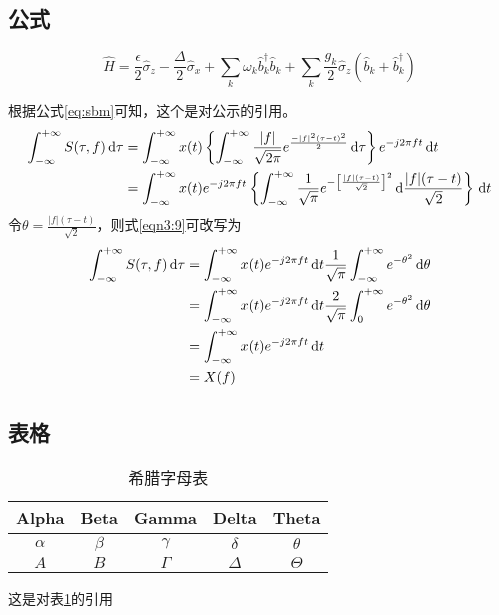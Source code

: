 \subsection{公式}
\begin{equation}
    \hat{H}=\frac{\epsilon}{2}\hat{\sigma}_{z}-\frac{\Delta}{2}\hat{\sigma}_{x}+\sum_{k}\omega_{k}\hat{b}_{k}^{\dagger}\hat{b}_{k}+\sum_{k}\frac{g_{k}}{2}\hat{\sigma}_{z}(\hat{b}_{k}+\hat{b}_{k}^{\dagger})\label{eq:sbm}
\end{equation}

根据公式\ref{eq:sbm}可知，这个是对公示的引用。
\begin{align}\label{eqn3:9}
    \int_{-\infty}^{+\infty}S(\tau,f)\,\mathrm{d}\tau & =\int_{-\infty}^{+\infty}x(t)\left\{\int_{-\infty}^{+\infty}\frac{|f|}{\sqrt{2\pi}}e^{\frac{-|f|^2(\tau-t)^2}{2}}\,\mathrm{d}\tau\right\}e^{-j2\pi ft}\,\mathrm{d}t\notag                                  \\
                                                      & =\int_{-\infty}^{+\infty}x(t)e^{-j2\pi ft}\left\{\int_{-\infty}^{+\infty}\frac{1}{\sqrt{\pi}}e^{-\left[\frac{|f|(\tau-t)}{\sqrt{2}}\right]^2}\,\mathrm{d}\frac{|f|(\tau-t)}{\sqrt{2}}\right\}\,\mathrm{d}t
\end{align}
令$\theta=\frac{|f|(\tau-t)}{\sqrt{2}}$，则式\eqref{eqn3:9}可改写为
\begin{align}\label{eqn3:10}
    \int_{-\infty}^{+\infty}S(\tau,f)\,\mathrm{d}\tau & =\int_{-\infty}^{+\infty}x(t)e^{-j2\pi ft}\,\mathrm{d}t\frac{1}{\sqrt{\pi}}\int_{-\infty}^{+\infty}e^{-\theta^2}\,\mathrm{d}\theta\notag \\
                                                      & =\int_{-\infty}^{+\infty}x(t)e^{-j2\pi ft}\,\mathrm{d}t\frac{2}{\sqrt{\pi}}\int_{0}^{+\infty}e^{-\theta^2}\,\mathrm{d}\theta\notag       \\
                                                      & =\int_{-\infty}^{+\infty}x(t)e^{-j2\pi ft}\,\mathrm{d}t\notag                                                                            \\
                                                      & =X(f)
\end{align}
\subsection{表格}
\begin{table}[H]
    \begin{center}
        \caption{希腊字母表\label{tab:Greek}}
        \begin{tabular}{ccccc}
            \toprule[1.5pt]
            Alpha    & Beta    & Gamma    & Delta    & Theta    \\
            \midrule[0.75pt]
            $\alpha$ & $\beta$ & $\gamma$ & $\delta$ & $\theta$ \\
            $A$      & $B$     & $\Gamma$ & $\Delta$ & $\Theta$ \\
            \bottomrule[1.5pt]
        \end{tabular}
    \end{center}
\end{table}
这是对表\ref{tab:Greek}的引用

